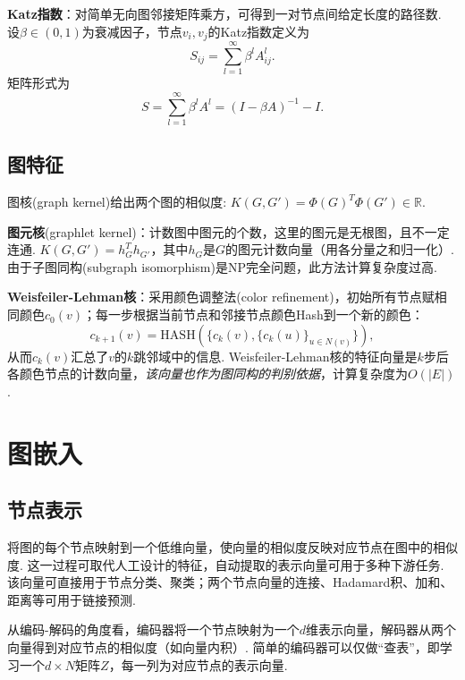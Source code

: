 \par \textbf{Katz指数}：对简单无向图邻接矩阵乘方，可得到一对节点间给定长度的路径数. 设$\beta \in (0,1)$为衰减因子，节点$v_i,v_j$的Katz指数定义为
\begin{equation}
    S_{ij}=\sum_{l=1}^\infty \beta^l A^l_{ij}.
\end{equation}
矩阵形式为
\begin{equation}
    S=\sum_{l=1}^\infty \beta^l A^l=(I-\beta A)^{-1}-I.
\end{equation}

\subsection{图特征}
\par 图核(graph kernel)给出两个图的相似度: $K(G,G')=\Phi(G)^T \Phi(G')\in \mathbb{R}$.
\par \textbf{图元核}(graphlet kernel)：计数图中图元的个数，这里的图元是无根图，且不一定连通. $K(G,G')=h_G^T h_{G'}$，其中$h_G$是$G$的图元计数向量（用各分量之和归一化）. 由于子图同构(subgraph isomorphism)是NP完全问题，此方法计算复杂度过高. 

\par \textbf{Weisfeiler-Lehman核}：采用颜色调整法(color refinement)，初始所有节点赋相同颜色$c_0(v)$；每一步根据当前节点和邻接节点颜色Hash到一个新的颜色：
\begin{equation}
    c_{k+1}(v)=\text{HASH}(\{c_k(v),\{c_k(u)\}_{u\in N(v)}\}),
\end{equation}
从而$c_k(v)$汇总了$v$的$k$跳邻域中的信息. Weisfeiler-Lehman核的特征向量是$k$步后各颜色节点的计数向量，\emph{该向量也作为图同构的判别依据}，计算复杂度为$O(\vert E \vert)$.

\section{图嵌入}

\subsection{节点表示}
\par 将图的每个节点映射到一个低维向量，使向量的相似度反映对应节点在图中的相似度. 这一过程可取代人工设计的特征，自动提取的表示向量可用于多种下游任务. 该向量可直接用于节点分类、聚类；两个节点向量的连接、Hadamard积、加和、距离等可用于链接预测. 

\par 从编码-解码的角度看，编码器将一个节点映射为一个$d$维表示向量，解码器从两个向量得到对应节点的相似度（如向量内积）. 简单的编码器可以仅做“查表”，即学习一个$d\times N$矩阵$Z$，每一列为对应节点的表示向量. 

